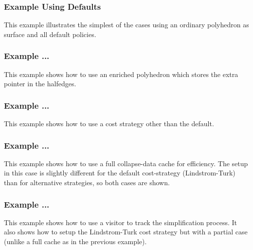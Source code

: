 \subsubsection{Example Using Defaults}

This example illustrates the simplest of the cases using an ordinary polyhedron as surface and all default policies.



\subsubsection{Example ...}

This example shows how to use an enriched polyhedron which stores the extra pointer in the halfedges.


\subsubsection{Example ...}

This example shows how to use a cost strategy other than the default.



\subsubsection{Example ...}

This example shows how to use a full collapse-data cache for efficiency. The setup in this case is slightly different for the default cost-strategy (Lindstrom-Turk) than for alternative strategies, so both cases are shown.



\subsubsection{Example ...}

This example shows how to use a visitor to track the simplification process. It also shows how to setup the Lindstrom-Turk cost strategy but with a partial case (unlike a full cache as in the previous example).



